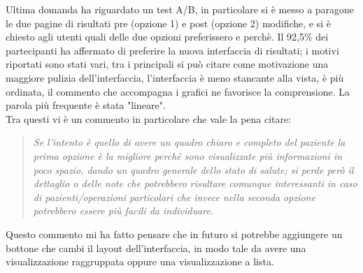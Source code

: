 Ultima domanda ha riguardato un test A/B, in particolare si è messo a paragone le due pagine di risultati pre (opzione 1) e post (opzione 2) modifiche, e si è chiesto agli utenti quali delle due opzioni preferissero e perchè. Il 92,5\% dei partecipanti ha affermato di preferire la nuova interfaccia di risultati; i motivi riportati sono stati vari, tra i principali si può citare come motivazione una maggiore pulizia dell'interfaccia, l'interfaccia è meno stancante alla vista, è più ordinata, il commento che accompagna i grafici ne favorisce la comprensione. La parola più frequente è stata "lineare". \\
Tra questi vi è un commento in particolare che vale la pena citare: 
\begin{quote}
    \textit{Se l'intento è quello di avere un quadro chiaro e completo del paziente la prima opzione è la migliore perché sono visualizzate più informazioni in poco spazio, dando un quadro generale dello stato di salute; si perde però il dettaglio o delle note che potrebbero risultare comunque interessanti in caso di pazienti/operazioni particolari che invece nella seconda opzione potrebbero essere più facili da individuare.}
\end{quote}
Questo commento mi ha fatto pensare che in futuro si potrebbe aggiungere un bottone che cambi il layout dell'interfaccia, in modo tale da avere una visualizzazione raggruppata oppure una visualizzazione a lista.